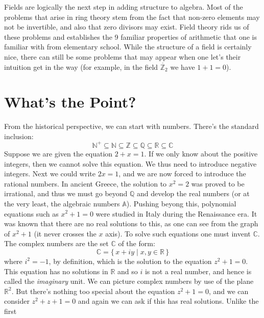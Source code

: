 Fields are logically the next step in adding structure to algebra. Most of
the problems that arise in ring theory stem from the fact that non-zero
elements may not be invertible, and also that zero divisors may exist. Field
theory rids us of these problems and establishes the 9 familiar properties
of arithmetic that one is familiar with from elementary school. While the
structure of a field is certainly nice, there can still be some problems
that may appear when one let's their intuition get in the way (for example,
in the field $\ring{\mathbb{Z}_{2}}$ we have $1+1=0$).
\section{What's the Point?}
    From the historical perspective, we can start with numbers. There's
    the standard inclusion:
    \begin{equation}
        \mathbb{N}^{+}\subseteq\mathbb{N}\subseteq
        \mathbb{Z}\subseteq\mathbb{Q}\subseteq\mathbb{R}
        \subseteq\mathbb{C}
    \end{equation}
    Suppose we are given the equation $2+x=1$. If we only know about
    the positive integers, then we cannot solve this equation. We thus
    need to introduce negative integers. Next we could write $2x=1$,
    and we are now forced to introduce the rational numbers. In ancient
    Greece, the solution to $x^{2}=2$ was proved to be irrational, and
    thus we must go beyond $\mathbb{Q}$ and develop the real numbers
    (or at the very least, the algebraic numbers $\mathbb{A}$). Pushing
    beyong this, polynomial equations such as $x^{2}+1=0$ were studied
    in Italy during the Renaissance era. It was known that there are no
    real solutions to this, as one can see from the graph of $x^{2}+1$
    (it never crosses the $x$ axis). To solve such equations one must
    invent $\mathbb{C}$. The complex numbers are the set $\mathbb{C}$ of
    the form:
    \begin{equation}
        \mathbb{C}=\{\,x+iy\;|\;x,y\in\mathbb{R}\,\}
    \end{equation}
    where $i^{2}=\minus{1}$, by definition, which is the solution to the
    equation $z^{2}+1=0$. This equation has no solutions in $\mathbb{R}$
    and so $i$ is not a real number, and hence is called the
    \textit{imaginary} unit. We can picture complex numbers by use of
    the plane $\mathbb{R}^{2}$. But there's nothing too special about
    the equation $z^{2}+1=0$, and we can consider $z^{2}+z+1=0$ and
    again we can ask if this has real solutions. Unlike the first
